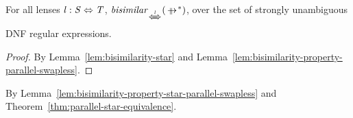 \documentclass[acmsmall]{acmart}
\begin{document}
\begin{lemma}
  \label{lem:bisimilarity-property-star-parallel-swapless}
  For all lenses $\mathit{l} : \mathit{S} \Leftrightarrow \mathit{T}$,
  $\IsBisimilarWithPropertyOf{\StarOf{\ParallelRewrite}}{\DNFLensHasSemanticsOf{\Lens}}$,
  over the set of strongly unambiguous DNF regular expressions.
\end{lemma}
\begin{proof}
  By Lemma~\ref{lem:bisimilarity-star} and
  Lemma~\ref{lem:bisimilarity-property-parallel-swapless}.
\end{proof}

\begin{corollary}
  \label{cor:bisimilarity-star-sequential}
  By Lemma~\ref{lem:bisimilarity-property-star-parallel-swapless} and
  Theorem~\ref{thm:parallel-star-equivalence}.
\end{corollary}
\end{document}
